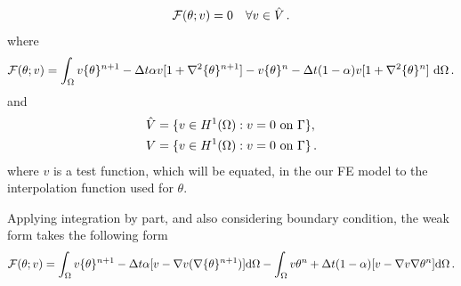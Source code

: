 \documentclass[]{article}
\begin{document}
\begin{equation}\label{eq7}
	\begin{aligned}
		\mathcal{F}(\theta;v) = 0 \quad \forall v \in \hat{V}\thinspace.
	\end{aligned}
\end{equation}
where
\begin{equation}\label{eq8}
	\begin{aligned}
		\mathcal{F}(\theta; v) =\int_{\Omega} v\{\theta\}^{n+1} -\Delta t\alpha v[1+\nabla^2\{ \theta\}^{n+1}] - v\{\theta\}^n - \Delta t(1 - \alpha)v[1+\nabla^2\{\theta\}^{n}]\ \mathrm{d}\Omega \thinspace .
	\end{aligned}
\end{equation}
and
\begin{equation}\label{eq9}
	\begin{aligned}
		\hat{V} &= \{v \in H^1(\Omega) : v = 0 \text{ on } \Gamma\}, \\
		V &= \{v \in H^1(\Omega) : v = 0 \text{ on } \Gamma\}\thinspace.
	\end{aligned}
\end{equation}
where $v$ is a test function, which will be equated, in the our FE model to the interpolation function used for $\theta$.

Applying integration by part, and also considering boundary condition, the weak form takes the following form
\begin{equation}\label{eq7}
	\begin{aligned}
		\mathcal{F}(\theta; v)=\int_{\Omega} v\{\theta\}^{n+1} - \Delta t \alpha [v - \nabla v (\nabla \{\theta\}^{n+1})] \mathrm{d} \Omega - \int_{\Omega} v\theta^{n} + \Delta t (1-\alpha) [v -\nabla v \nabla\theta^n ] \mathrm{d} \Omega\thinspace.
	\end{aligned}
\end{equation}
\end{document}
